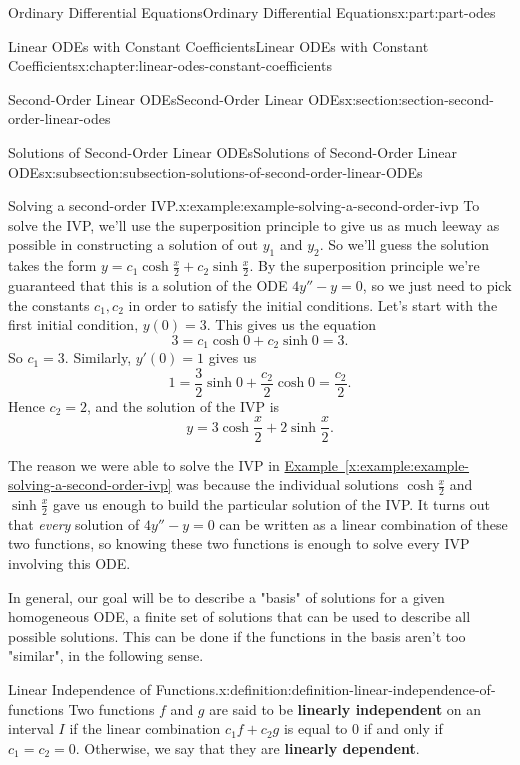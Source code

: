 \documentclass[oneside,10pt,]{book}
\newcommand{\xreffont}{\relax}
\newcommand{\terminology}[1]{\textbf{#1}}
\numberwithin{equation}{part}
\begin{document}
\begin{partptx}{Ordinary Differential Equations}{}{Ordinary Differential Equations}{}{}{x:part:part-odes}
\begin{chapterptx}{Linear ODEs with Constant Coefficients}{}{Linear ODEs with Constant Coefficients}{}{}{x:chapter:linear-odes-constant-coefficients}
\begin{sectionptx}{Second-Order Linear ODEs}{}{Second-Order Linear ODEs}{}{}{x:section:section-second-order-linear-odes}
\begin{subsectionptx}{Solutions of Second-Order Linear ODEs}{}{Solutions of Second-Order Linear ODEs}{}{}{x:subsection:subsection-solutions-of-second-order-linear-ODEs}
\begin{example}{Solving a second-order IVP.}{x:example:example-solving-a-second-order-ivp}
To solve the IVP, we'll use the superposition principle to give us as much leeway as possible in constructing a solution of out \(y_{1}\) and \(y_{2}\). So we'll guess the solution takes the form \(y = c_{1}\cosh\frac{x}{2} + c_{2}\sinh\frac{x}{2}\). By the superposition principle we're guaranteed that this is a solution of the ODE \(4y''-y=0\), so we just need to pick the constants \(c_{1},c_{2}\) in order to satisfy the initial conditions. Let's start with the first initial condition, \(y(0) = 3\). This gives us the equation%
\begin{equation*}
3 = c_{1}\cosh0+c_{2}\sinh0 = 3.
\end{equation*}
So \(c_{1} = 3\). Similarly, \(y'(0) = 1\) gives us%
\begin{equation*}
1 = \frac{3}{2}\sinh0+\frac{c_{2}}{2}\cosh0 = \frac{c_{2}}{2}.
\end{equation*}
Hence \(c_{2} = 2\), and the solution of the IVP is%
\begin{equation*}
y = 3\cosh\frac{x}{2} + 2\sinh\frac{x}{2}.
\end{equation*}
%
\end{example}
The reason we were able to solve the IVP in \hyperref[x:example:example-solving-a-second-order-ivp]{Example~{\xreffont\ref{x:example:example-solving-a-second-order-ivp}}} was because the individual solutions \(\cosh\frac{x}{2}\) and \(\sinh\frac{x}{2}\) gave us enough to build the particular solution of the IVP. It turns out that \emph{every} solution of \(4y''-y=0\) can be written as a linear combination of these two functions, so knowing these two functions is enough to solve every IVP involving this ODE.%
\par
In general, our goal will be to describe a "basis" of solutions for a given homogeneous ODE, a finite set of solutions that can be used to describe all possible solutions. This can be done if the functions in the basis aren't too "similar", in the following sense.%
\begin{definition}{Linear Independence of Functions.}{x:definition:definition-linear-independence-of-functions}%
%
Two functions \(f\) and \(g\) are said to be \terminology{linearly independent} on an interval \(I\) if the linear combination \(c_{1}f + c_{2}g\) is equal to \(0\) if and only if \(c_{1} = c_{2} = 0\). Otherwise, we say that they are \terminology{linearly dependent}.%
\end{definition}

\end{subsectionptx}
\end{sectionptx}
\end{chapterptx}
\end{partptx}
\end{document}
